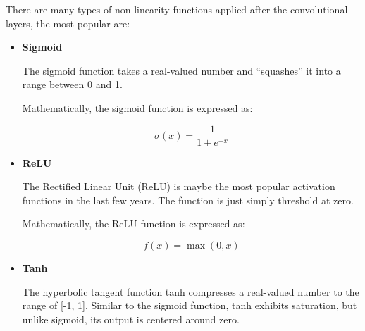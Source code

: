 There are many types of non-linearity functions applied after the convolutional
layers, the most popular are: \newline

\begin{itemize}

  \item \textbf{Sigmoid}

    The sigmoid function takes a real-valued number and “squashes” it into a
    range between 0 and 1.


      \raggedright
      Mathematically, the sigmoid function is expressed as:

      \[ \sigma(x) = \frac{1}{1 + e^{-x}} \]

    \item \textbf{ReLU}

      The Rectified Linear Unit (ReLU) is maybe the most popular activation
      functions in the last few years. The function is just simply threshold at
      zero.

      \newpage

      \centering {}

      \raggedright
      Mathematically, the ReLU function is expressed as:

      \[f(x) = \max(0, x)\]

    \item \textbf{Tanh}

      The hyperbolic tangent function tanh compresses a real-valued number to
      the range of [-1, 1]. Similar to the sigmoid function, tanh exhibits
      saturation, but unlike sigmoid, its output is centered around zero.


\end{itemize}
